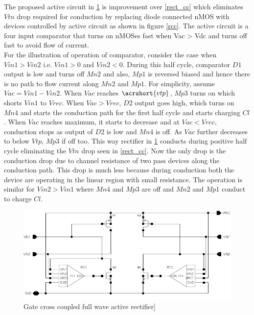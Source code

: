 \documentclass[12pt,a4paper,UKenglish]{report}
\begin{document}
The proposed active circuit in \ref{rect_rcc} is improvement over \ref{rect_cc} which eliminates $Vtn$ drop required for conduction by replacing diode connected nMOS with devices controlled by active circuit as shown in figure \ref{rcc}. The active circuit is a four input comparator that turns on nMOSes fast when Vac > Vdc and turns off fast to avoid flow of current. \\

For the illustration of operation of comparator, consider the case when $Vin1 > Vin2$ i.e. $Vin1 > 0$ and $Vin2 < 0$. During this half cycle, comparator $D1$ output is low and turns off $Mn2$ and also, $Mp1$ is reversed biased and hence there is no path to flow current along $Mn2$ and $Mp1$. For simplicity, assume $Vac =  Vin1 - Vin2$. When $Vac$ reaches $\acrshort{vtp}$, $Mp3$ turns on which shorts $Vin1$ to $Vrec$. When $Vac > Vrec$, $D2$ output goes high, which turns on $Mn4$ and starts the conduction path for the first half cycle and starts charging $Cl$. When $Vac$ reaches maximum, it starts to decrease and at $Vac < Vrec$, conduction stops as output of $D2$ is low and $Mn4$ is off. As $Vac$ further decreases to below $Vtp$, $Mp3$ if off too. This way rectifier in \ref{rect_rcc}  conducts during positive half cycle eliminating the $Vtn$ drop seen in \ref{rect_cc}. Now the only drop is the conduction drop due to channel resistance of two pass devices along the conduction path. This drop is much less because during conduction both the device are operating in the linear region with small resistance. The operation is similar for $Vin2 > Vin1$ where $Mn4$ and $Mp3$ are off and $Mn2$ and $Mp1$ conduct to charge $Cl$. \\

\begin{figure}[htbp] %
   \centering
   \includegraphics[width=\textwidth]{img/rectifier_schematic.pdf} 
   \caption{Gate cross coupled full wave active rectifier]}
   \label{rect_rcc}
\end{figure}
\end{document}
